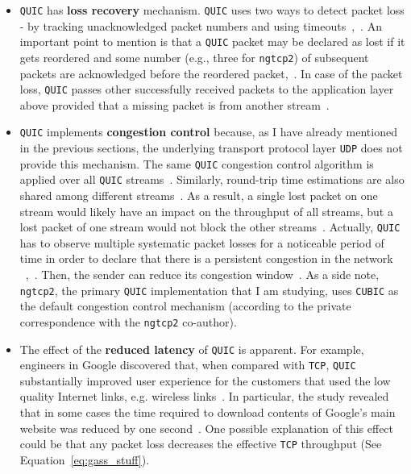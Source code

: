 \documentclass[12pt,a4paper,twoside,openright]{report}
\begin{document}
\begin{itemize}
    
    
    \item  \texttt{QUIC} has \textbf{loss recovery} mechanism.
    \texttt{QUIC} uses two ways to detect packet loss - by tracking unacknowledged packet numbers and using timeouts~\cite{UnderstandQUIC},~\cite[Section~6]{ietf-quic-recovery-32}.
    An important point to mention is that a \texttt{QUIC} packet may be declared as lost if it gets reordered and some number (e.g., three for \texttt{ngtcp2}) of subsequent packets are acknowledged before the reordered packet,~\cite[Section~6]{ietf-quic-recovery-32}.
    In case of the packet loss, \texttt{QUIC} passes other successfully received packets to the application layer above provided that a missing packet is from another stream~\cite{head-of-line-blocking-in-quic-and-http-3-the-details}.
   
   \item \texttt{QUIC} implements \textbf{congestion control} because, as I have already mentioned in the previous sections, the underlying transport protocol layer \texttt{UDP} does not provide this mechanism. 
   The same \texttt{QUIC} congestion control algorithm is applied over all \texttt{QUIC} streams~\cite{head-of-line-blocking-in-quic-and-http-3-the-details, UnderstandQUIC}.
   Similarly, round-trip time estimations are also shared among different streams~\cite[Section~4.2]{ietf-quic-recovery-32}.
   As a result, a single lost packet on one stream would likely have an impact on the throughput of all streams, but a lost packet of one stream would not block the other streams~\cite{head-of-line-blocking-in-quic-and-http-3-the-details, UnderstandQUIC}.
   Actually, \texttt{QUIC} has to observe multiple systematic packet losses for a noticeable period of time in order to declare that there is a persistent congestion in the network ~\cite[Section~4]{ietf-quic-recovery-32},~\cite{UnderstandQUIC}.
   Then, the sender can reduce its congestion window~\cite{UnderstandQUIC}.
   As a side note, \texttt{ngtcp2}, the primary \texttt{QUIC} implementation that I am studying, uses \texttt{CUBIC} as the default congestion control mechanism (according to the private correspondence with the \texttt{ngtcp2} co-author).
  
  

 

  
  
  \item The effect of the \textbf{reduced latency} of \texttt{QUIC} is apparent.
  For example, engineers in Google discovered that, when compared with \texttt{TCP}, \texttt{QUIC} substantially improved user experience for the customers that used the low quality Internet links, e.g. wireless links~\cite{chromium_blog_about_quic, quic-vs-tcptls-and-why-quic-is-not-the-next-big-thing}.
  In particular, the study revealed that in some cases the time required to download contents of Google's main website was reduced by one second~\cite{chromium_blog_about_quic}.
  One possible explanation of this effect could be that any packet loss decreases the effective \texttt{TCP} throughput (See Equation~\ref{eq:gass_stuff}).
  

\end{itemize}
\end{document}
